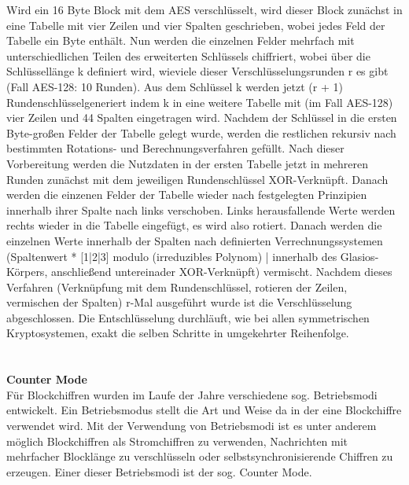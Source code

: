 \documentclass[12pt,a4paper,bibliography=totocnumbered,listof=totocnumbered]{scrartcl}
\begin{document}
Wird ein 16 Byte Block mit dem AES verschlüsselt, wird dieser Block zunächst in eine Tabelle mit vier Zeilen und vier Spalten geschrieben, wobei jedes Feld der Tabelle ein Byte enthält. Nun werden die einzelnen Felder mehrfach mit unterschiedlichen Teilen des erweiterten Schlüssels chiffriert, wobei über die Schlüssellänge k definiert wird, wieviele dieser Verschlüsselungsrunden r es gibt (Fall AES-128: 10 Runden). Aus dem Schlüssel k werden jetzt (r + 1) Rundenschlüsselgeneriert indem k in eine weitere Tabelle mit (im Fall AES-128) vier Zeilen und 44 Spalten eingetragen wird. Nachdem der Schlüssel in die ersten Byte-großen Felder der Tabelle gelegt wurde, werden die restlichen rekursiv nach bestimmten Rotations- und Berechnungsverfahren gefüllt. Nach dieser Vorbereitung werden die Nutzdaten in der ersten Tabelle jetzt in mehreren Runden zunächst mit dem jeweiligen Rundenschlüssel XOR-Verknüpft. Danach werden die einzenen Felder der Tabelle wieder nach festgelegten Prinzipien innerhalb ihrer Spalte nach links verschoben. Links herausfallende Werte werden rechts wieder in die Tabelle eingefügt, es wird also rotiert. Danach werden die einzelnen Werte innerhalb der Spalten nach definierten Verrechnungssystemen (Spaltenwert * [1|2|3] modulo (irreduzibles Polynom) | innerhalb des Glasios-Körpers, anschließend untereinader XOR-Verknüpft) vermischt. Nachdem dieses Verfahren (Verknüpfung mit dem Rundenschlüssel, rotieren der Zeilen, vermischen der Spalten) r-Mal ausgeführt wurde ist die Verschlüsselung abgeschlossen. Die Entschlüsselung durchläuft, wie bei allen symmetrischen Kryptosystemen, exakt die selben Schritte in umgekehrter Reihenfolge.
\\\cite{4}\cite{5}\\
\\\textbf{Counter Mode}\\
Für Blockchiffren wurden im Laufe der Jahre verschiedene sog. Betriebsmodi entwickelt. Ein Betriebsmodus stellt die Art und Weise da in der eine Blockchiffre verwendet wird. Mit der Verwendung von Betriebsmodi ist es unter anderem möglich Blockchiffren   als   Stromchiffren   zu   verwenden,   Nachrichten   mit   mehrfacher   Blocklänge   zu   verschlüsseln   oder selbstsynchronisierende Chiffren zu erzeugen. Einer dieser Betriebsmodi ist der sog. Counter Mode.
\end{document}
